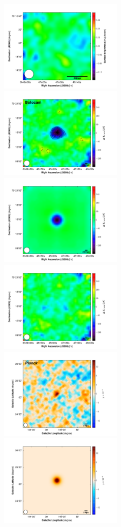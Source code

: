 \documentclass[traditabstract]{aa}
\begin{document}
\begin{figure}[h!]
\includegraphics[height=4.4cm]{Paper_Mustang_Residual.pdf}
\includegraphics[height=4.4cm]{Paper_Bolocam_Data.pdf}
\includegraphics[height=4.4cm]{Paper_Bolocam_Model.pdf}
\includegraphics[height=4.4cm]{Paper_Bolocam_Residual.pdf}
\includegraphics[height=4.4cm]{Paper_Planck_Data.pdf}
\includegraphics[height=4.4cm]{Paper_Planck_Model.pdf}

\end{figure}
\end{document}

